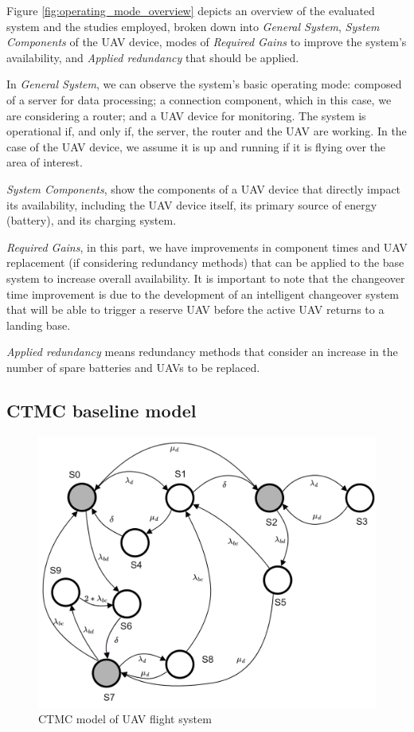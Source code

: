 \documentclass[conference]{IEEEtran}
\begin{document}
Figure \ref{fig:operating_mode_overview} depicts an overview of the evaluated system and the studies employed, broken down into \textit{General System}, \textit{System Components} of the UAV device, modes of \textit{Required Gains} to improve the system's availability, and \textit {Applied redundancy} that should be applied.

In \textit{General System}, we can observe the system’s basic operating mode: composed of a server for data processing; a connection component, which in this case, we are considering a router; and a UAV device for monitoring. The system is operational if, and only if, the server, the router and the UAV are working. In the case of the UAV device, we assume it is up and running if it is flying over the area of interest.

\textit{System Components}, show the components of a UAV device that directly impact its availability, including the UAV device itself, its primary source of energy (battery), and its charging system.

\textit{Required Gains}, in this part, we have improvements in component times and UAV replacement (if considering redundancy methods) that can be applied to the base system to increase overall availability. It is important to note that the changeover time improvement is due to the development of an intelligent changeover system that will be able to trigger a reserve UAV before the active UAV returns to a landing base.  

\textit{Applied redundancy} means redundancy methods that consider an increase in the number of spare batteries and UAVs to be replaced.

\subsection{CTMC baseline model}


\begin{figure}[htbp]
\centerline{\includegraphics[scale=0.75]{img/CTMC_transparent.png}}
\caption{CTMC model of UAV flight system}
\label{fig:ctmc_model}
\end{figure}
\end{document}
